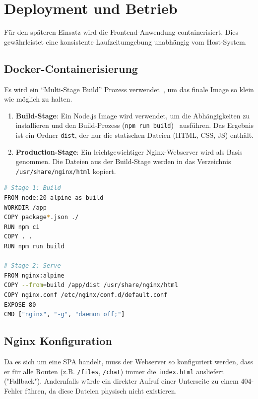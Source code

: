 \section{Deployment und Betrieb}
Für den späteren Einsatz wird die Frontend-Anwendung containerisiert. Dies gewährleistet eine konsistente Laufzeitumgebung unabhängig vom Host-System.

\subsection{Docker-Containerisierung}
Es wird ein "`Multi-Stage Build"' Prozess verwendet~\cite{docker}, um das finale Image so klein wie möglich zu halten.
\begin{enumerate}
    \item \textbf{Build-Stage}: Ein Node.js Image wird verwendet, um die Abhängigkeiten zu installieren und den Build-Prozess (\texttt{npm run build})~\cite{ViteDocs} ausführen. Das Ergebnis ist ein Ordner \texttt{dist}, der nur die statischen Dateien (HTML, CSS, JS) enthält.
    \item \textbf{Production-Stage}: Ein leichtgewichtiger Nginx-Webserver wird als Basis genommen. Die Dateien aus der Build-Stage werden in das Verzeichnis \texttt{/usr/share/nginx/html} kopiert.
\end{enumerate}

\begin{lstlisting}[language=bash, caption={Dockerfile für das Frontend}]
# Stage 1: Build
FROM node:20-alpine as build
WORKDIR /app
COPY package*.json ./
RUN npm ci
COPY . .
RUN npm run build

# Stage 2: Serve
FROM nginx:alpine
COPY --from=build /app/dist /usr/share/nginx/html
COPY nginx.conf /etc/nginx/conf.d/default.conf
EXPOSE 80
CMD ["nginx", "-g", "daemon off;"]
\end{lstlisting}
\newpage

\subsection{Nginx Konfiguration}
Da es sich um eine SPA handelt, muss der Webserver so konfiguriert werden, dass er für alle Routen (z.B. \texttt{/files}, \texttt{/chat}) immer die \texttt{index.html} ausliefert ("Fallback"). Andernfalls würde ein direkter Aufruf einer Unterseite zu einem 404-Fehler führen, da diese Dateien physisch nicht existieren.
